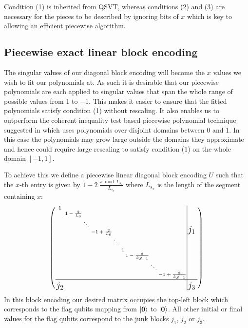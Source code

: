 \documentclass[a4paper,twocolumn,,accepted=2025-05-27]{quantumarticle}
\theoremstyle{empty}
\begin{document}
Condition (1) is inherited from QSVT, whereas conditions (2) and (3) are necessary for the pieces to be described by ignoring bits of $x$ which is key to allowing an efficient piecewise algorithm.

\subsection{Piecewise exact linear block encoding}
\label{section:linear_block}
The singular values of our diagonal block encoding will become the $x$ values we wish to fit our polynomials at. As such it is desirable that our piecewise polynomials are each applied to singular values that span the whole range of possible values from 1 to $-1$. This makes it easier to ensure that the fitted polynomials satisfy condition (1) without rescaling. It also enables us to outperform the coherent inequality test based piecewise polynomial technique suggested in \cite{mcardleQuantumStatePreparation2022} which uses polynomials over disjoint domains between 0 and 1. In this case the polynomials may grow large outside the domains they approximate and hence could require large rescaling to satisfy condition (1) on the whole domain $[-1, 1]$.

To achieve this we define a piecewise linear diagonal block encoding $U$ such that the $x$-th entry is given by $1 - 2\>\frac{x \bmod L_{s_x}}{L_{s_x}}$ where $L_{s_x}$ is the length of the segment containing $x$:
\begin{equation*}
\scriptsize
\setlength{\arraycolsep}{1pt}
\renewcommand{\arraystretch}{1.0}
\left(
\begin{array}{ccccccccc|cc}
1 &   &   &   &   &   &   &   &   & \multirow{9}{*}{\Large $j_1$} & \\
  & 1 - \frac{2}{L_0} &   &   &   &   &   &   &   &  & \\
  &   & \ddots &   &   &   &   &   &   &  & \\
  &   &   & -1 + \frac{2}{L_0} &   &   &   &   &   &  & \\
  &   &   &   & \ddots &   &   &   &   &  & \\
  &   &   &   &   & 1 &   &   &   &  & \\
  &   &   &   &   &   & 1 - \frac{2}{L_{S-1}} &   &   &  & \\
  &   &   &   &   &   &   & \ddots &   &  & \\
  &   &   &   &   &   &   &   & -1 + \frac{2}{L_{S-1}} &  & \\
\hline
\multirow{2}{*}{\Large $j_2$} &   &   &   &   &   &   &   &   & \multirow{2}{*}{\Large $j_3$} & \\
                              &   &   &   &   &   &   &   &   &  & \\
\end{array}\right)
\end{equation*}
In this block encoding our desired matrix occupies the top-left block which corresponds to the flag qubits mapping from $\ket{\bm 0}$ to $\ket{\bm 0}$. All other initial or final values for the flag qubits correspond to the junk blocks $j_1$, $j_2$ or $j_3$.
\end{document}
